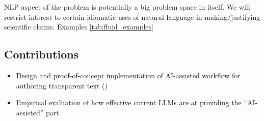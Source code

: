 NLP aspect of the problem is potentially a big problem space in itself. We will restrict interest to certain
idiomatic uses of natural language in making/justifying scientific claims.
Examples \ref{tab:fluid_examples}



\subsection{Contributions}

\begin{itemize}
    \item Design and proof-of-concept implementation of AI-assisted workflow for authoring transparent text
    ()
    \item Empirical evaluation of how effective current LLMs are at providing the ``AI-assisted'' part
\end{itemize}
